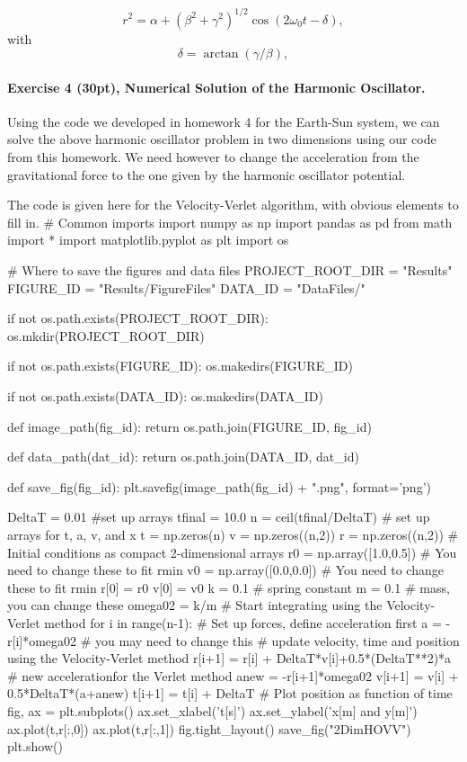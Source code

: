 \documentclass[%
oneside,                 %
final,                   %
10pt]{article}
\begin{document}
\noindent
\[
r^2=\alpha+(\beta^2+\gamma^2)^{1/2}\cos(2\omega_0 t-\delta),
\]
with
\[
\delta=\arctan(\gamma/\beta),
\]


\paragraph{Exercise 4 (30pt), Numerical Solution of the Harmonic Oscillator.}
Using the code we developed in homework 4 for the Earth-Sun system, we can solve the above harmonic oscillator problem in two dimensions using our code from this homework. We need however to change the acceleration from the gravitational force to the one given by the harmonic oscillator potential.

The code is given here for the Velocity-Verlet algorithm, with obvious elements to fill in. 
\bpycod
# Common imports
import numpy as np
import pandas as pd
from math import *
import matplotlib.pyplot as plt
import os

# Where to save the figures and data files
PROJECT_ROOT_DIR = "Results"
FIGURE_ID = "Results/FigureFiles"
DATA_ID = "DataFiles/"

if not os.path.exists(PROJECT_ROOT_DIR):
    os.mkdir(PROJECT_ROOT_DIR)

if not os.path.exists(FIGURE_ID):
    os.makedirs(FIGURE_ID)

if not os.path.exists(DATA_ID):
    os.makedirs(DATA_ID)

def image_path(fig_id):
    return os.path.join(FIGURE_ID, fig_id)

def data_path(dat_id):
    return os.path.join(DATA_ID, dat_id)

def save_fig(fig_id):
    plt.savefig(image_path(fig_id) + ".png", format='png')

DeltaT = 0.01
#set up arrays 
tfinal = 10.0
n = ceil(tfinal/DeltaT)
# set up arrays for t, a, v, and x
t = np.zeros(n)
v = np.zeros((n,2))
r = np.zeros((n,2))
# Initial conditions as compact 2-dimensional arrays
r0 = np.array([1.0,0.5])  # You need to  change these to fit rmin
v0 = np.array([0.0,0.0]) # You need to change these to fit rmin
r[0] = r0
v[0] = v0
k = 0.1   # spring constant
m = 0.1   # mass, you can change these
omega02 = k/m
# Start integrating using the Velocity-Verlet  method
for i in range(n-1):
    # Set up forces, define acceleration first
    a =  -r[i]*omega02  # you may need to change this
    # update velocity, time and position using the Velocity-Verlet method
    r[i+1] = r[i] + DeltaT*v[i]+0.5*(DeltaT**2)*a
    # new accelerationfor the Verlet method
    anew = -r[i+1]*omega02  
    v[i+1] = v[i] + 0.5*DeltaT*(a+anew)
    t[i+1] = t[i] + DeltaT
# Plot position as function of time    
fig, ax = plt.subplots()
ax.set_xlabel('t[s]')
ax.set_ylabel('x[m] and y[m]')
ax.plot(t,r[:,0])
ax.plot(t,r[:,1])
fig.tight_layout()
save_fig("2DimHOVV")
plt.show()
\end{document}
